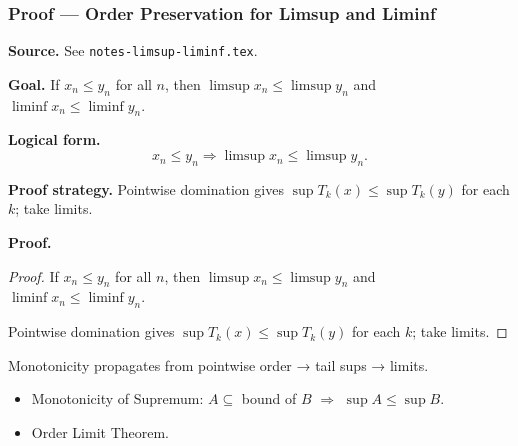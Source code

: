 
\clearpage
{}
\hypertarget{proof-RA-ABB-T-limsup-order-pres}{}

\subsubsection[Order Preservation for Limsup and Liminf]{Proof --- Order Preservation for Limsup and Liminf}

\bigskip

\noindent
\textbf{Source.} See \texttt{notes-limsup-liminf.tex}.

\vspace{0.75em}

\noindent
\textbf{Goal.} If $x_n \le y_n$ for all $n$, then $\limsup x_n \le \limsup y_n$ and $\liminf x_n \le \liminf y_n$.

\vspace{0.75em}

\noindent
\textbf{Logical form.}
\[
  x_n \le y_n \Rightarrow \limsup x_n \le \limsup y_n.
\]

\vspace{0.75em}

\noindent
\textbf{Proof strategy.} Pointwise domination gives $\sup T_k(x) \le \sup T_k(y)$ for each $k$; take limits.

\vspace{0.75em}

\noindent
\textbf{Proof.}
\begin{proof}
\Claim If $x_n \le y_n$ for all $n$, then $\limsup x_n \le \limsup y_n$ and $\liminf x_n \le \liminf y_n$.

\Given 

\Goal 

\Strategy Pointwise domination gives $\sup T_k(x) \le \sup T_k(y)$ for each $k$; take limits.

\medskip


\end{proof}

\begin{remark*}
Monotonicity propagates from pointwise order → tail sups → limits.
\end{remark*}

\begin{remark*}[Dependencies]
\begin{itemize}
  \item Monotonicity of Supremum: $A \subseteq$ bound of $B$ $\Rightarrow$ $\sup A \le \sup B$.
  \item Order Limit Theorem.
\end{itemize}
\end{remark*}
